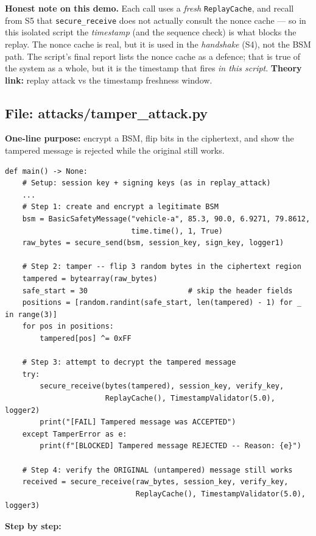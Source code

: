 \documentclass[11pt,a4paper]{article}
\begin{document}
\textbf{Honest note on this demo.} Each call uses a \emph{fresh}
\texttt{ReplayCache}, and recall from S5 that \texttt{secure\_receive} does not
actually consult the nonce cache --- so in this isolated script the
\emph{timestamp} (and the sequence check) is what blocks the replay. The nonce
cache is real, but it is used in the \emph{handshake} (S4), not the BSM path. The
script's final report lists the nonce cache as a defence; that is true of the
system as a whole, but it is the timestamp that fires \emph{in this script}.
\textbf{Theory link:} replay attack vs the timestamp freshness window.

\subsection{File: attacks/tamper\_attack.py}
\textbf{One-line purpose:} encrypt a BSM, flip bits in the ciphertext, and show
the tampered message is rejected while the original still works.
\begin{lstlisting}[style=py,caption={tamper\_attack.py --- the tamper attack (key parts).}]
def main() -> None:
    # Setup: session key + signing keys (as in replay_attack)
    ...
    # Step 1: create and encrypt a legitimate BSM
    bsm = BasicSafetyMessage("vehicle-a", 85.3, 90.0, 6.9271, 79.8612,
                             time.time(), 1, True)
    raw_bytes = secure_send(bsm, session_key, sign_key, logger1)

    # Step 2: tamper -- flip 3 random bytes in the ciphertext region
    tampered = bytearray(raw_bytes)
    safe_start = 30                       # skip the header fields
    positions = [random.randint(safe_start, len(tampered) - 1) for _ in range(3)]
    for pos in positions:
        tampered[pos] ^= 0xFF

    # Step 3: attempt to decrypt the tampered message
    try:
        secure_receive(bytes(tampered), session_key, verify_key,
                       ReplayCache(), TimestampValidator(5.0), logger2)
        print("[FAIL] Tampered message was ACCEPTED")
    except TamperError as e:
        print(f"[BLOCKED] Tampered message REJECTED -- Reason: {e}")

    # Step 4: verify the ORIGINAL (untampered) message still works
    received = secure_receive(raw_bytes, session_key, verify_key,
                              ReplayCache(), TimestampValidator(5.0), logger3)
\end{lstlisting}
\textbf{Step by step:}
\end{document}
